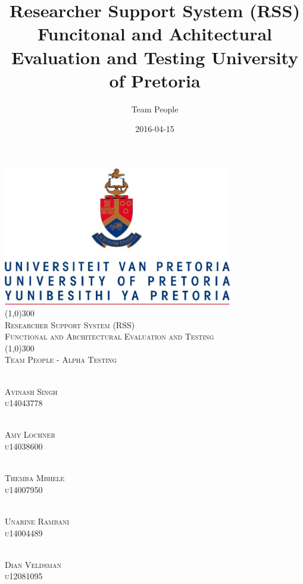 \documentclass{article}
\title{
Researcher Support System (RSS)
Funcitonal and Achitectural Evaluation and Testing
University of Pretoria
}
\date{2016-04-15}
\author{Team People}
\begin{document}
\begin{titlepage}
	\begin{center}
		\includegraphics[width=10cm]{UP.jpg}  \\
		[1cm]
		\line(1,0){300} \\
		[0.3cm]
		\textsc{\Large
			Researcher Support System (RSS)\\
			Functional and Architectural Evaluation and Testing
		}\\
		[0.1cm]
		\line(1,0){300} \\
		[0.4cm]
		\textsc{\Large
			Team People - Alpha Testing
		} \\



	\end{center}
	\begin{center}

	\textsc{\large\\
	Avinash Singh\\ 
	u14043778\\ 
	}
	
	\textsc{\large\\
	Amy Lochner\\
	u14038600\\ 
	}
	
	\textsc{\large\\
	Themba Mbhele\\
	u14007950\\ 
	}

	\textsc{\large\\
	Unarine Rambani\\
	u14004489 \\
	}
	
	\textsc{\large\\
	Dian Veldsman\\
	u12081095\\
	}
	
	\end{center}
\end{titlepage}
\end{document}
